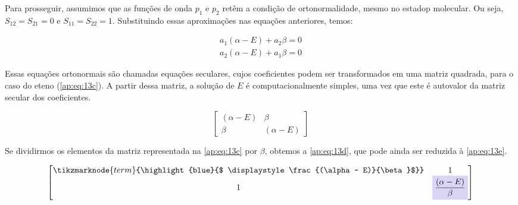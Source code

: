 Para prosseguir, assumimos que as funções de onda $p_1$ e $p_2$ retêm a condição de ortonormalidade, mesmo no estadop molecular. Ou seja, $S_{12} = S_{21} = 0$ e $S_{11} = S_{22} = 1$. Substituindo essas aproximações nas equações anteriores, temos:

\begin{figure}[htb]
    \vspace{1\baselineskip}
\begin{align}
\label{ap:eq:13b1}
    a_1 (\alpha - E) + a_2 \beta = 0 \\[0.35cm]
    a_2 (\alpha - E) + a_1 \beta = 0
\end{align}
\end{figure}

Essas equações ortonormais são chamadas equações seculares, cujos coeficientes podem ser transformados em uma matriz quadrada, para o caso do eteno (\autoref{ap:eq:13c}). A partir dessa matriz, a solução de $E$ é computacionalmente simples, uma vez que este é autovalor da matriz secular dos coeficientes.

\begin{figure}[htb]
    \vspace{1\baselineskip}
\begin{equation}
\label{ap:eq:13c}
\begin{bmatrix}
    (\alpha - E) & \beta \\
    \beta  & (\alpha - E)
\end{bmatrix}
\end{equation}
\end{figure}


Se dividirmos os elementos da matriz representada na \autoref{ap:eq:13c} por $\beta$, obtemos a \autoref{ap:eq:13d}, que pode ainda ser reduzida à \autoref{ap:eq:13e}.

\newpage

\begin{figure}[htb]
    \vspace{3 \baselineskip}
\begin{equation}
\label{ap:eq:13d}
\begin{bmatrix}
    \displaystyle \tikzmarknode{term}{\highlight{blue}{$ \displaystyle \frac{(\alpha - E)}{\beta}$}} & 1 \\
    1  & \highlight{blue}{$\displaystyle \frac{(\alpha - E)}{\beta}$}
\end{bmatrix}
\end{equation}
\end{figure}

